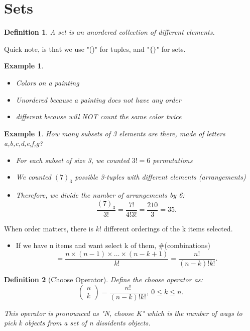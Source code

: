 \documentclass[a4paper]{article}
\newcounter{counter}
\numberwithin{counter}{subsection}
\theoremstyle{break}
\newtheorem{definition}{Definition}
\newtheorem{exmp}[counter]{Example}
\begin{document}
	\section{Sets}%
		\begin{definition}
			A set is an unordered collection of different elements.
		\end{definition}
	
		Quick note, is that we use "()" for tuples, and "$\{\}$" for sets. 

		\begin{exmp}
			\begin{itemize}
				\item Colors on a painting
				\item Unordered because a painting does not have any order
				\item different because will NOT count the same color twice
			\end{itemize}
		\end{exmp}

		\begin{exmp}
			How many subsets of 3 elements are there, made of letters a,b,c,d,e,f,g?
			\begin{itemize}
				\item For each subset of size 3, we counted $3! = 6$ permutations 
				\item We counted $(7)_3$ possible 3-tuples with different elements (arrangements)
				\item Therefore, we divide the number of arrangements by 6: \[
						\frac{(7)_3}{3!} = \frac{7!}{4! 3!} = \frac{210}{3} = 35
				.\] 
			\end{itemize}
		\end{exmp}

		When order matters, there is $k!$ different orderings of the k items selected.
		 \begin{itemize}
			 \item If we have n items and want select k of them, \#(combinations) \[
					  = \frac{n \times (n-1) \times \ldots \times (n - k + 1)}{k!} = \frac{n!}{(n-k)!k!} 
			 .\] 
		\end{itemize}

		\begin{definition}[Choose Operator]
			Define the choose operator as: \[
				\begin{pmatrix} n \\ k\end{pmatrix} = \frac{n!}{(n-k)!k!}, ~ 0 \le k \le n 
			.\] 

			This operator is pronounced as "N, choose K" which is the number of ways to pick k objects from a set of n dissidents objects.
		\end{definition}
\end{document}
